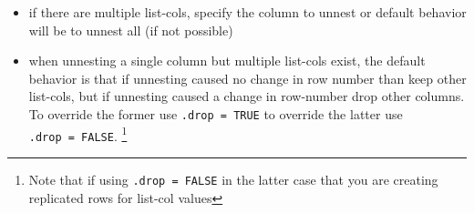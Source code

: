 \documentclass[]{book}
\newenvironment{Shaded}{\begin{snugshade}}{\end{snugshade}}
\newcommand{\CommentTok}[1]{\textcolor[rgb]{0.56,0.35,0.01}{\textit{#1}}}
\newcommand{\DataTypeTok}[1]{\textcolor[rgb]{0.13,0.29,0.53}{#1}}
\newcommand{\DecValTok}[1]{\textcolor[rgb]{0.00,0.00,0.81}{#1}}
\newcommand{\KeywordTok}[1]{\textcolor[rgb]{0.13,0.29,0.53}{\textbf{#1}}}
\newcommand{\NormalTok}[1]{#1}
\newcommand{\OperatorTok}[1]{\textcolor[rgb]{0.81,0.36,0.00}{\textbf{#1}}}
\newcommand{\StringTok}[1]{\textcolor[rgb]{0.31,0.60,0.02}{#1}}
\providecommand{\tightlist}{%
  \setlength{\itemsep}{0pt}\setlength{\parskip}{0pt}}
\let\rmarkdownfootnote\footnote%
\def\footnote{\protect\rmarkdownfootnote}
\theoremstyle{definition}
\theoremstyle{definition}
\theoremstyle{definition}
\theoremstyle{remark}
\begin{document}
\begin{Shaded}
\end{Shaded}

\begin{itemize}
\tightlist
\item
  if there are multiple list-cols, specify the column to unnest or
  default behavior will be to unnest all (if not possible)
\item
  when unnesting a single column but multiple list-cols exist, the
  default behavior is that if unnesting caused no change in row number
  than keep other list-cols, but if unnesting caused a change in
  row-number drop other columns. To override the former use
  \texttt{.drop\ =\ TRUE} to override the latter use
  \texttt{.drop\ =\ FALSE}. \footnote{Note that if using
    \texttt{.drop\ =\ FALSE} in the latter case that you are creating
    replicated rows for list-col values}
\end{itemize}
\end{document}
